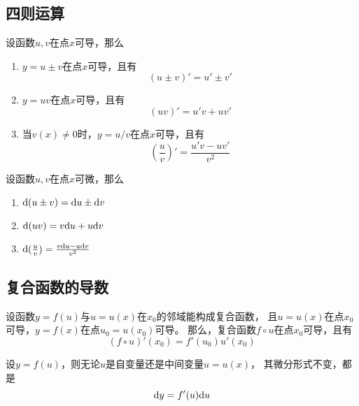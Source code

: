 \subsection{四则运算}
\begin{theorem}[导数的四则运算]
  设函数$u,v$在点$x$可导，那么
  \begin{enumerate}
    \item 
    $y=u\pm v$在点$x$可导，且有
    \begin{displaymath}
      (u\pm v)'=u'\pm v'
    \end{displaymath}
    \item 
    $y=uv$在点$x$可导，且有
    \begin{displaymath}
      (uv)' = u'v+uv'
    \end{displaymath}
    \item 
    当$v(x)\neq 0$时，$y=u/v$在点$x$可导，且有
    \begin{displaymath}
      \left(\frac{u}{v}\right)'=\frac{u'v-uv'}{v^2}
    \end{displaymath}
  \end{enumerate}
\end{theorem}

\begin{theorem}[微分的四则运算]
  设函数$u,v$在点$x$可微，那么
  \begin{enumerate}
    \item 
    $\textrm{d} (u\pm v) = \textrm{d} u \pm \textrm{d} v$
    \item 
    $\textrm{d} (uv) = v\textrm{d} u + u \textrm{d} v$
    \item 
    $\textrm{d} (\frac{u}{v}) = \frac{v\textrm{d} u - u\textrm{d} v}{v^2}$
  \end{enumerate}
\end{theorem}

\subsection{复合函数的导数}
\begin{theorem}[复合函数的导数]
  设函数$y=f(u)$与$u=u(x)$在$x_0$的邻域能构成复合函数，
  且$u=u(x)$在点$x_0$可导，$y=f(x)$在点$u_0=u(x_0)$可导。
  那么，复合函数$f\circ u$在点$x_0$可导，且有
  \begin{displaymath}
    (f\circ u)'(x_0) = f'(u_0)u'(x_0)
  \end{displaymath}
\end{theorem}

\begin{corollary}[一阶微分形式不变性]
  设$y=f(u)$，则无论$u$是自变量还是中间变量$u=u(x)$，
  其微分形式不变，都是
  \begin{displaymath}
    \textrm{d} y = f'(u)\textrm{d} u
  \end{displaymath}
\end{corollary}

